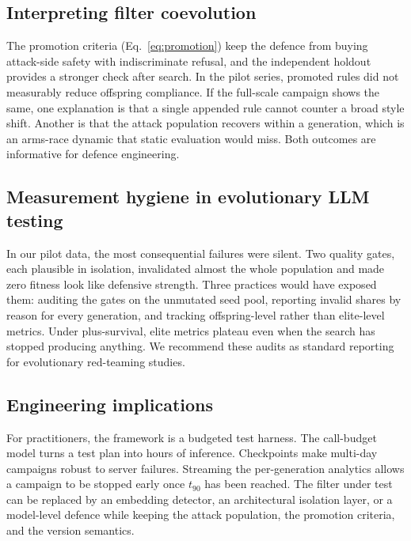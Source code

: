 \documentclass[preprint,12pt,authoryear]{elsarticle}
\begin{document}
\subsection{Interpreting filter coevolution}
The promotion criteria (Eq.~\ref{eq:promotion}) keep the defence from buying attack-side safety with indiscriminate refusal, and the independent holdout provides a stronger check after search. In the pilot series, promoted rules did not measurably reduce offspring compliance. If the full-scale campaign shows the same, one explanation is that a single appended rule cannot counter a broad style shift. Another is that the attack population recovers within a generation, which is an arms-race dynamic that static evaluation would miss. Both outcomes are informative for defence engineering.

\subsection{Measurement hygiene in evolutionary LLM testing}
In our pilot data, the most consequential failures were silent. Two quality gates, each plausible in isolation, invalidated almost the whole population and made zero fitness look like defensive strength. Three practices would have exposed them: auditing the gates on the unmutated seed pool, reporting invalid shares by reason for every generation, and tracking offspring-level rather than elite-level metrics. Under plus-survival, elite metrics plateau even when the search has stopped producing anything. We recommend these audits as standard reporting for evolutionary red-teaming studies.

\subsection{Engineering implications}
For practitioners, the framework is a budgeted test harness. The call-budget model turns a test plan into hours of inference. Checkpoints make multi-day campaigns robust to server failures. Streaming the per-generation analytics allows a campaign to be stopped early once $t_{90}$ has been reached. The filter under test can be replaced by an embedding detector, an architectural isolation layer, or a model-level defence while keeping the attack population, the promotion criteria, and the version semantics.
\end{document}
